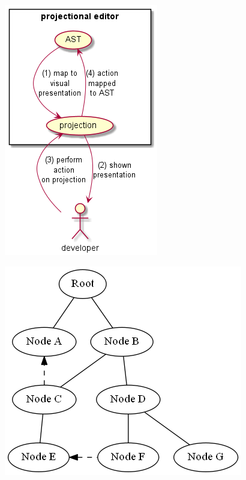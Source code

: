\begin{figure}
    \centering
    \begin{minipage}[b][][b]{.45\textwidth}
      \centering
      \includegraphics[width=.80\linewidth]{Sections/images/projections.png}
      \label{fig:projectionalEditing_loop}
    \end{minipage}%
    \begin{minipage}[b][][b]{.55\textwidth}
      \centering
      \includegraphics[width=.95\linewidth]{Sections/images/ast.png}
      \label{fig:ast}
    \end{minipage}
\end{figure}

